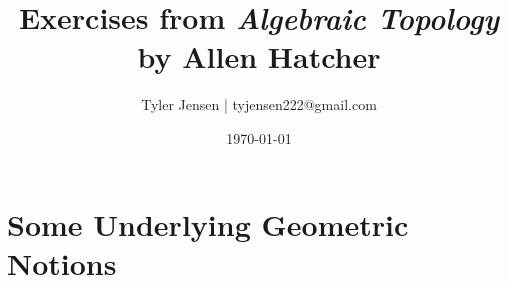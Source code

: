 \documentclass[12pt]{book}
\title{Exercises from \textit{Algebraic Topology} \\
       by Allen Hatcher}
\author{Tyler Jensen | tyjensen222@gmail.com}
\date{\today}
\theoremstyle{definition}
\begin{document}
\frontmatter
\maketitle
\tableofcontents

\mainmatter

\setcounter{chapter}{-1}

\chapter{Some Underlying Geometric Notions}
\end{document}

